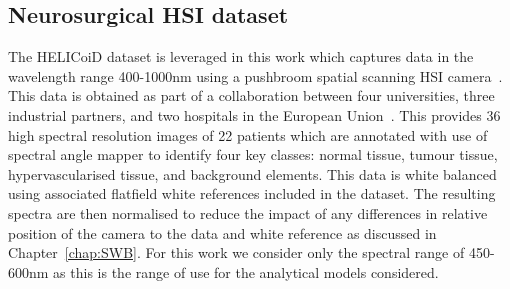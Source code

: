 \subsection{Neurosurgical HSI dataset}\label{sec:NeuroHSIdata}
The HELICoiD dataset is leveraged in this work which captures data in the wavelength range 400-1000nm using a pushbroom spatial scanning HSI camera~\citep{Fabelo2019}. This data is obtained as part of a collaboration between four universities, three industrial partners, and two hospitals in the European Union~\citep{Fabelo2019}. This provides 36 high spectral resolution images of 22 patients which are annotated with use of spectral angle mapper to identify four key classes: normal tissue, tumour tissue, hypervascularised tissue, and background elements. This data is white balanced using associated flatfield white references included in the dataset. The resulting spectra are then normalised to reduce the impact of any differences in relative position of the camera to the data and white reference as discussed in Chapter~\ref{chap:SWB}. For this work we consider only the spectral range of 450-600nm as this is the range of use for the analytical models considered. 

